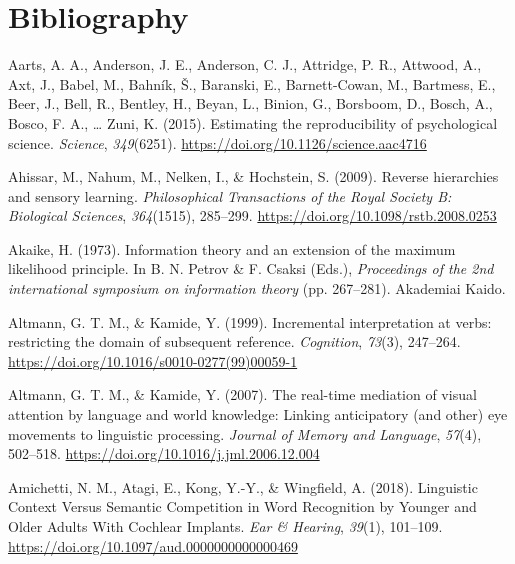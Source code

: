 \documentclass[a4paper, nobind]{templates/ociamthesis}
\newlength{\cslhangindent}
\newenvironment{CSLReferences}[2] %
 {%
  \setlength{\parindent}{0pt}
  \ifodd #1
  \let\oldpar\par
  \def\par{\hangindent=\cslhangindent\oldpar}
  \fi
  \setlength{\parskip}{1mm}
  \setlength{\baselineskip}{6mm}
 }%
 {}
\begin{document}
\hypertarget{bibliography}{%
\chapter*{Bibliography}\label{bibliography}}

\hypertarget{refs}{}
\begin{CSLReferences}{1}{0}
\leavevmode{}%
Aarts, A. A., Anderson, J. E., Anderson, C. J., Attridge, P. R., Attwood, A., Axt, J., Babel, M., Bahník, Š., Baranski, E., Barnett-Cowan, M., Bartmess, E., Beer, J., Bell, R., Bentley, H., Beyan, L., Binion, G., Borsboom, D., Bosch, A., Bosco, F. A., \ldots{} Zuni, K. (2015). {Estimating the reproducibility of psychological science}. \emph{Science}, \emph{349}(6251). \url{https://doi.org/10.1126/science.aac4716}

\leavevmode{}%
Ahissar, M., Nahum, M., Nelken, I., \& Hochstein, S. (2009). {Reverse hierarchies and sensory learning}. \emph{Philosophical Transactions of the Royal Society B: Biological Sciences}, \emph{364}(1515), 285--299. \url{https://doi.org/10.1098/rstb.2008.0253}

\leavevmode{}%
Akaike, H. (1973). Information theory and an extension of the maximum likelihood principle. In B. N. Petrov \& F. Csaksi (Eds.), \emph{Proceedings of the 2nd international symposium on information theory} (pp. 267--281). Akademiai Kaido.

\leavevmode{}%
Altmann, G. T. M., \& Kamide, Y. (1999). Incremental interpretation at verbs: restricting the domain of subsequent reference. \emph{Cognition}, \emph{73}(3), 247--264. \url{https://doi.org/10.1016/s0010-0277(99)00059-1}

\leavevmode{}%
Altmann, G. T. M., \& Kamide, Y. (2007). {The real-time mediation of visual attention by language and world knowledge: Linking anticipatory (and other) eye movements to linguistic processing}. \emph{Journal of Memory and Language}, \emph{57}(4), 502--518. \url{https://doi.org/10.1016/j.jml.2006.12.004}

\leavevmode{}%
Amichetti, N. M., Atagi, E., Kong, Y.-Y., \& Wingfield, A. (2018). Linguistic Context Versus Semantic Competition in Word Recognition by Younger and Older Adults With Cochlear Implants. \emph{Ear \& Hearing}, \emph{39}(1), 101--109. \url{https://doi.org/10.1097/aud.0000000000000469}


\end{CSLReferences}
\end{document}

